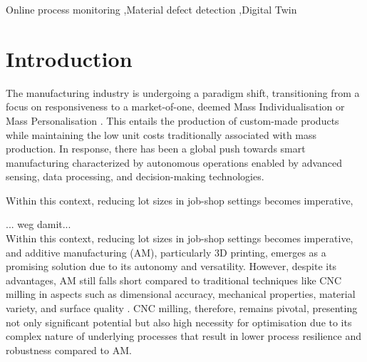 \documentclass[5p,times,procedia]{elsarticle}
\newenvironment{note}{%
	\noindent
    \color{notecolor}%
}{%
    \par\medskip%
}
\begin{document}
\begin{frontmatter}
\begin{keyword}
 Online process monitoring \sep Material defect detection \sep Digital Twin





\end{keyword}

\end{frontmatter}


\section{Introduction}\label{Sec_Introduction}


The manufacturing industry is undergoing a paradigm shift, transitioning from a focus on responsiveness to a market-of-one, deemed Mass Individualisation\cite{Lu.Xu.ea2020} or Mass Personalisation \cite{Qin.Lu2021}. This entails the production of custom-made products while maintaining the low unit costs traditionally associated with mass production.
In response, there has been a global push towards smart manufacturing characterized by autonomous operations enabled by advanced sensing, data processing, and decision-making technologies. \cite{Gu.Koren2022, Lu.Morris.ea2016}

Within this context, reducing lot sizes in job-shop settings becomes imperative,



\begin{note}
... weg damit...\\
Within this context, reducing lot sizes in job-shop settings becomes imperative, and additive manufacturing (AM), particularly 3D printing, emerges as a promising solution due to its autonomy and versatility.
However, despite its advantages, AM still falls short compared to traditional techniques like CNC milling in aspects such as dimensional accuracy, mechanical properties, material variety, and surface quality \cite{Chen.Lin2017, Schmidt2016}.
CNC milling, therefore, remains pivotal, presenting not only significant potential but also high necessity for optimisation due to its complex nature of underlying processes that result in lower process resilience and robustness compared to AM.
\end{note}
\end{document}
